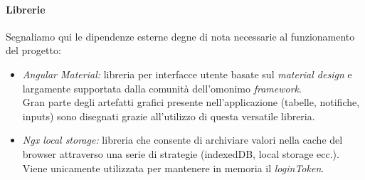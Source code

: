 \documentclass[12pt]{article}
\begin{document}
\paragraph{Librerie}
Segnaliamo qui le dipendenze esterne degne di nota necessarie al funzionamento del progetto:
\begin{itemize}
\item \textit{Angular Material:} libreria per interfacce utente basate sul \textit{material design} e largamente supportata dalla comunità dell'omonimo \textit{framework}.\\
Gran parte degli artefatti grafici presente nell'applicazione (tabelle, notifiche, inputs) sono disegnati grazie all'utilizzo di questa versatile libreria.
\item \textit{Ngx local storage:} libreria che consente di archiviare valori nella cache del browser attraverso una serie di strategie (indexedDB, local storage ecc.).\\
Viene unicamente utilizzata per mantenere in memoria il \textit{loginToken}.
\end{itemize}
\end{document}
